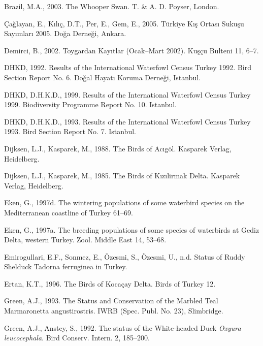 \documentclass[
  a4paper,
  DIV=11,
  numbers=noendperiod]{scrartcl}
\newlength{\cslhangindent}
\newenvironment{CSLReferences}[2] %
 {\begin{list}{}{%
  \setlength{\itemindent}{0pt}
  \setlength{\leftmargin}{0pt}
  \setlength{\parsep}{0pt}
  \ifodd #1
   \setlength{\leftmargin}{\cslhangindent}
   \setlength{\itemindent}{-1\cslhangindent}
  \fi
  \setlength{\itemsep}{#2\baselineskip}}}
 {\end{list}}
\begin{document}
\begin{CSLReferences}{1}{0}
Brazil, M.A., 2003. {The Whooper Swan}. T. \& A. D. Poyser, London.

Çağlayan, E., Kılıç, D.T., Per, E., Gem, E., 2005. {Türkiye Kış Ortası
Sukuşu Sayımları 2005}. Doğa Derneği, Ankara.

Demirci, B., 2002. {Toygardan Kayıtlar (Ocak--Mart 2002)}. Kuşçu Bulteni
11, 6--7.

DHKD, 1992. {Results of the International Waterfowl Census Turkey 1992.
Bird Section Report No. 6}. Doğal Hayatı Koruma Derneği, Istanbul.

DHKD, D.H.K.D., 1999. {Results of the International Waterfowl Census
Turkey 1999. Biodiversity Programme Report No. 10}. Istanbul.

DHKD, D.H.K.D., 1993. {Results of the International Waterfowl Census
Turkey 1993. Bird Section Report No. 7}. Istanbul.

Dijksen, L.J., Kasparek, M., 1988. {The Birds of Acıgöl}. Kasparek
Verlag, Heidelberg.

Dijksen, L.J., Kasparek, M., 1985. {The Birds of Kızılirmak Delta}.
Kasparek Verlag, Heidelberg.

Eken, G., 1997d. {The wintering populations of some waterbird species on
the Mediterranean coastline of Turkey} 61--69.

Eken, G., 1997a. {The breeding populations of some species of waterbirds
at Gediz Delta, western Turkey}. Zool. Middle East 14, 53--68.

Emirogullari, E.F., Sonmez, E., Özesmi, S., Özesmi, U., n.d. {Status of
Ruddy Shelduck Tadorna ferruginea in Turkey}.

Ertan, K.T., 1996. {The Birds of Kocaçay Delta}. Birds of Turkey 12.

Green, A.J., 1993. {The Status and Conservation of the Marbled Teal
Marmaronetta angustirostris}. IWRB (Spec. Publ. No. 23), Slimbridge.

Green, A.J., Anstey, S., 1992. {The status of the White-headed Duck
\emph{Oxyura leucocephala}}. Bird Conserv. Intern. 2, 185--200.


\end{CSLReferences}
\end{document}
